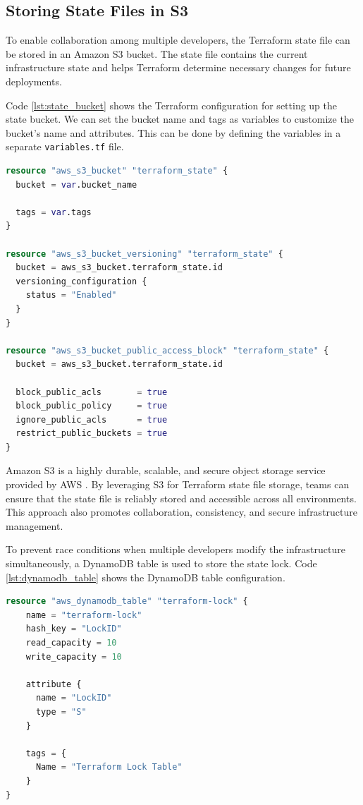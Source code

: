 \subsection{Storing State Files in S3}
To enable collaboration among multiple developers, the Terraform state file can be stored in an Amazon S3 bucket. The state file contains the current infrastructure state and helps Terraform determine necessary changes for future deployments.


Code \ref{lst:state_bucket} shows the Terraform configuration for setting up the state bucket. We can set the bucket name and tags as variables to customize the bucket's name and attributes. This can be done by defining the variables in a separate \texttt{variables.tf} file.

\begin{lstlisting}[language=Terraform, caption={Terraform Configuration for Setting Up State Bucket}, label={lst:state_bucket}]
resource "aws_s3_bucket" "terraform_state" {
  bucket = var.bucket_name

  tags = var.tags
}

resource "aws_s3_bucket_versioning" "terraform_state" {
  bucket = aws_s3_bucket.terraform_state.id
  versioning_configuration {
    status = "Enabled"
  }
}

resource "aws_s3_bucket_public_access_block" "terraform_state" {
  bucket = aws_s3_bucket.terraform_state.id

  block_public_acls       = true
  block_public_policy     = true
  ignore_public_acls      = true
  restrict_public_buckets = true
}
\end{lstlisting}

Amazon S3 is a highly durable, scalable, and secure object storage service provided by AWS \cite{s3}. By leveraging S3 for Terraform state file storage, teams can ensure that the state file is reliably stored and accessible across all environments. This approach also promotes collaboration, consistency, and secure infrastructure management.

To prevent race conditions when multiple developers modify the infrastructure simultaneously, a DynamoDB table \cite{dynamodb} is used to store the state lock. Code \ref{lst:dynamodb_table} shows the DynamoDB table configuration.

\begin{lstlisting}[language=Terraform, caption={Terraform Configuration for Setting Up DynamoDB Table}, label={lst:dynamodb_table}]
resource "aws_dynamodb_table" "terraform-lock" {
    name = "terraform-lock"
    hash_key = "LockID"
    read_capacity = 10
    write_capacity = 10
    
    attribute {
      name = "LockID"
      type = "S"
    }
    
    tags = {
      Name = "Terraform Lock Table"
    }
}
\end{lstlisting}

